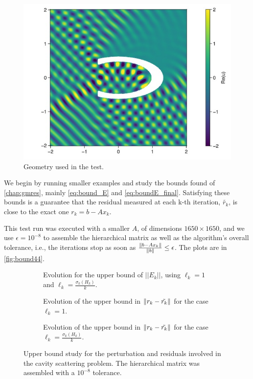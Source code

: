 \begin{figure}[h!]
    \centering
    \includegraphics[width=0.5\linewidth]{images/cavity_fig.jpg}
    \caption{Geometry used in the test.}
    \label{fig:cavity_fig}
\end{figure}


We begin by running smaller examples and study the bounds found of \autoref{chap:gmres}, mainly \ref{eq:bound_E} and \ref{eq:boundE_final}. Satisfying these bounds is a guarantee that the residual measured at each k-th iteration, $\tilde{r_{k}}$, is close to the exact one $r_{k} =b-Ax_{k}$.


This test run was executed with a smaller $A$, of dimensions $1650\times 1650$, and we use $\epsilon = 10^{-8}$ to assemble the hierarchical matrix as well as the algorithm's overall tolerance, i.e., the iterations stop as soon as $\frac{\left\lVert b - Ax_{k}\right\rVert}{\left\lVert b\right\rVert} \leq \epsilon$. The plots are in \autoref{fig:bound44}.

\begin{figure}[h!]
    \centering
    \begin{subfigure}[b]{0.6\linewidth}
        
        \caption{Evolution for the upper bound of $||E_{k}||$, using $\ell_{k}=1$ and $\ell_{k}=\frac{\sigma_{k}(H_{k})}{k}$.}
    \end{subfigure}

    \begin{subfigure}[b]{0.4\linewidth}
        
        \caption{Evolution of the upper bound in $\left\lVert r_{k} - \tilde{r_{k}}\right\rVert$ for the case $\ell_{k}=1$.}
    \end{subfigure}
    \begin{subfigure}[b]{0.4\linewidth}
        
        \caption{Evolution of the upper bound in $\left\lVert r_{k} - \tilde{r_{k}}\right\rVert$ for the case $\ell_{k}=\frac{\sigma_{k}(H_{k})}{k}$.}
    \end{subfigure}
    \caption{Upper bound study for the perturbation and residuals involved in the cavity scattering problem. The hierarchical matrix was assembled with a $10^{-8}$ tolerance.}
    \label{fig:bound44}
\end{figure}

